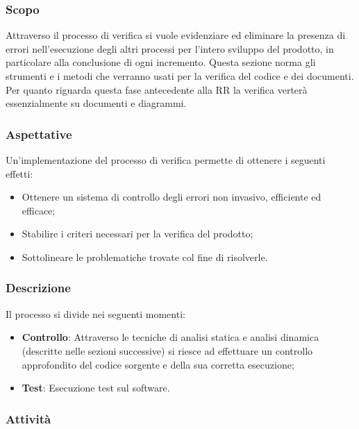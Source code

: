 \subsubsection{Scopo}
Attraverso il processo di verifica si vuole evidenziare ed eliminare la presenza di errori nell'esecuzione degli altri processi per l'intero sviluppo del prodotto, in particolare alla conclusione di ogni incremento.
Questa sezione norma gli strumenti e i metodi che verranno usati per la verifica del codice e dei documenti.
Per quanto riguarda questa fase antecedente alla RR la verifica verterà
essenzialmente su documenti e diagrammi.



\subsubsection{Aspettative}
Un’implementazione del processo di verifica permette di ottenere i seguenti effetti:
    \begin{itemize}
        \item Ottenere un sistema di controllo degli errori non invasivo, efficiente ed efficace;
        \item Stabilire i criteri necessari per la verifica del prodotto;
        \item Sottolineare le problematiche trovate col fine di risolverle.
    \end{itemize}

\subsubsection{Descrizione}
Il processo si divide nei seguenti momenti:
    \begin{itemize}
        \item \textbf{Controllo}: Attraverso le tecniche di analisi statica e analisi dinamica (descritte nelle sezioni successive) si riesce ad
        effettuare un controllo approfondito del codice sorgente e della sua corretta esecuzione;
        \item \textbf{Test}: Esecuzione test sul software.
    \end{itemize}

\subsubsection{Attività}

